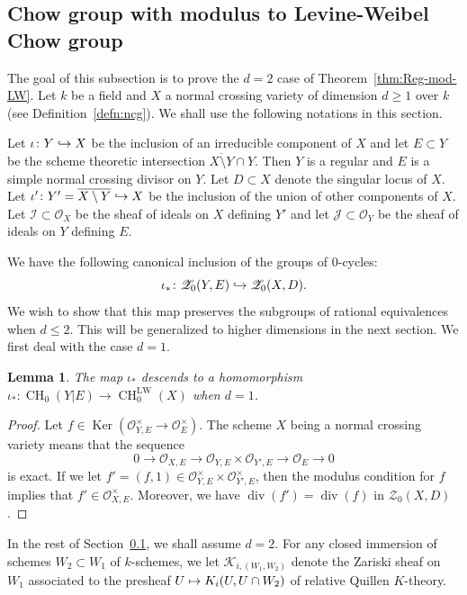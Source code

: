 \documentclass[11pt]{article}
\numberwithin{equation}{section}
\let\mathcal\mathscr
\def\mto{\mathchoice{\longmapsto}{\mapsto}{\mapsto}{\mapsto}}
\def\hto{\mathrel{\lhook\joinrel\to}}
\let\inj\hto
\newcommand{\LW}{\mathrm{LW}}
\newtheorem{lem}[thm]{Lemma}
\theoremstyle{definition}
\newcommand{\thmref}{Theorem~\ref}
\newcommand{\defref}{Definition~\ref}
\newcommand{\secref}{Section~\ref}
\newcommand{\sI}{{\mathcal I}}
\newcommand{\sJ}{{\mathcal J}}
\newcommand{\sK}{{\mathcal K}}
\newcommand{\sO}{{\mathcal O}}\let\cO\sO
\newcommand{\sZ}{{\mathcal Z}}
\DeclareMathOperator{\CH}{CH}
\DeclareMathOperator{\divf}{div}
\DeclareMathOperator{\Ker}{Ker}
\let\ov\overline
\begin{document}
\subsection{Chow group with modulus to
Levine-Weibel Chow group}\label{sec:CMLW}
The goal of this subsection is to prove the $d =2$ case of \thmref{thm:Reg-mod-LW}.
Let $k$ be a field and $X$ a normal crossing variety of dimension $d \ge 1$ over $k$
(see \defref{defn:ncg}).
We shall use the following notations in this section.

Let $\iota \colon Y \inj X$ be the inclusion of an irreducible component
of $X$ and let $E \subset Y$ be the scheme theoretic intersection
$\ov{X \setminus Y} \cap Y$. Then $Y$ is a regular
and $E$ is a simple normal crossing
divisor on $Y$. Let $D \subset X$ denote the singular locus of $X$.
Let $\iota' \colon Y' = \ov{X \setminus Y} \inj X$ be the inclusion of the
union of other components of $X$.
Let $\sI \subset \sO_X$ be the sheaf of ideals on $X$ defining $Y'$
and let $\sJ \subset \sO_Y$ be the sheaf of ideals on $Y$ defining $E$.

We have the following canonical inclusion of the groups of $0$-cycles:
\begin{equation}\label{eqn:$0$-cycle-incl}
\iota_* \colon \sZ_0(Y, E) \inj \sZ_0(X, D).
\end{equation}
We wish to show that this map preserves the subgroups
of rational equivalences when $d \le 2$. This will be generalized
to higher dimensions in the next section. We first deal with the case $d =1$.

\begin{lem}\label{lem:NC-surface-3}
The map $\iota_*$ descends to a homomorphism
\hbox{$\iota_* \colon \CH_0(Y|E)\!\to\!\CH^{\LW}_0(X)$} when $d = 1$.
\end{lem}
\begin{proof}
Let $f \in \Ker(\sO^{\times}_{Y, E} \to
\sO^{\times}_{E})$.
The scheme $X$ being a normal crossing variety means that the
sequence
\begin{equation}\label{eqn:NC-surface-3-0}
0 \to \sO_{X, E} \to \sO_{Y,E} \times \sO_{Y',E} \to \sO_{E} \to 0
\end{equation}
is exact.
If we let $f' = (f,1) \in \sO^{\times}_{Y,E} \times \sO^{\times}_{Y',E}$, then
the modulus condition for $f$ implies that $f' \in \sO^{\times}_{X,E}$.
Moreover, we have $\divf(f') = \divf(f)$ in $\sZ_0(X,D)$.
\end{proof}

In the rest of \secref{sec:CMLW}, we shall assume $d = 2$.
For any closed immersion of schemes $W_2 \subset W_1$ of $k$-schemes, we let
$\sK_{i, (W_1, W_2)}$ denote the Zariski sheaf on $W_1$ associated to the
presheaf $U \mto K_i(U, U \cap W_2)$ of relative Quillen $K$-theory.
\end{document}
